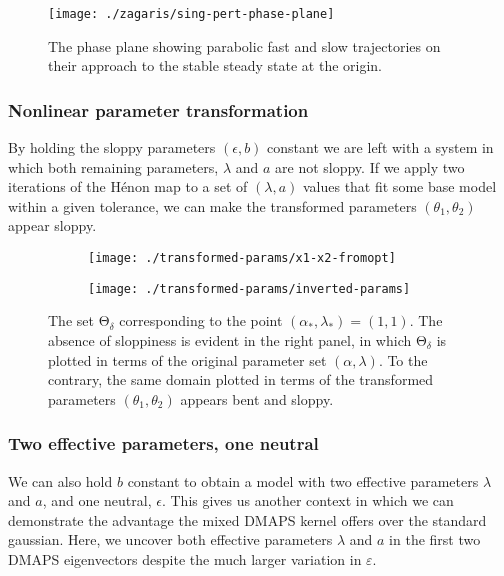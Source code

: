 \documentclass[11pt]{article}
\newcommand{\ps}{\mathrm{\Theta}}
\newcommand{\p}{\theta}
\newcommand{\eps}{\varepsilon}
\begin{document}
\begin{figure}[htbp]
  \centering
  \texttt{[image: ./zagaris/sing-pert-phase-plane]}
  \caption{The phase plane showing parabolic fast and slow
    trajectories on their approach to the stable steady state at the origin.}
\end{figure}


\subsubsection{Nonlinear parameter transformation}

By holding the sloppy parameters $(\epsilon, b)$ constant we are left
with a system in which both remaining parameters, $\lambda$ and $a$
are not sloppy. If we apply two iterations of the H\'{e}non map to a
set of $(\lambda, a)$ values that fit some base model within a given
tolerance, we can make the transformed parameters $(\theta_1,
\theta_2)$ appear sloppy.

\begin{figure}[ht!]
  \begin{subfigure}[t]{0.49\textwidth}
    \centering
    \texttt{[image: ./transformed-params/x1-x2-fromopt]}
  \end{subfigure}
  \begin{subfigure}[t]{0.49\textwidth}
    \centering
    \texttt{[image: ./transformed-params/inverted-params]}
  \end{subfigure} %
  \caption{The set $\ps_\delta$ corresponding to the point
    $(\alpha_*,\lambda_*) = (1,1)$. The absence of
    sloppiness is evident in the right panel, in which $\ps_\delta$ is
    plotted in terms of the original parameter set
    $(\alpha,\lambda)$. To the contrary, the same domain plotted in
    terms of the transformed parameters $(\p_1,\p_2)$ appears bent and
    sloppy. \label{f.transf-params}}
\end{figure}

\subsubsection{Two effective parameters, one neutral}

We can also hold $b$ constant to obtain a model with two effective
parameters $\lambda$ and $a$, and one neutral, $\epsilon$. This gives
us another context in which we can demonstrate the advantage the mixed DMAPS
kernel offers over the standard gaussian. Here, we uncover both
effective parameters $\lambda$ and $a$ in the first two DMAPS
eigenvectors despite the much larger variation in $\eps$.
\end{document}
